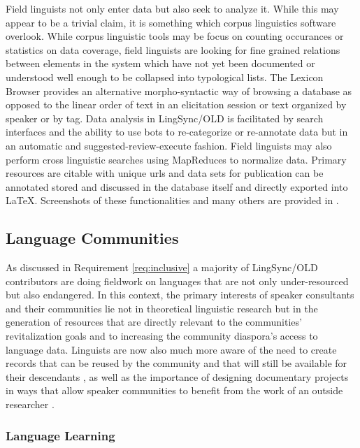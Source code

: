 \documentclass[11pt]{article}
\begin{document}
Field linguists not only enter data but also seek to analyze it. While this may appear to be a trivial claim, it is something which corpus linguistics software overlook. While corpus linguistic tools may be focus on counting occurances or statistics on data coverage, field linguists are looking for fine grained relations between elements in the system which have not yet been documented or understood well enough to be collapsed into typological lists. The Lexicon Browser provides an alternative morpho-syntactic way of browsing a database as opposed to the linear order of text in an elicitation session or text organized by speaker or by tag. Data analysis in LingSync/OLD is facilitated by search  interfaces and the ability to use bots to re-categorize or re-annotate data but in an automatic and suggested-review-execute fashion. Field linguists may also perform cross linguistic searches using MapReduces to normalize data. Primary resources are citable with unique urls and data sets for publication can be annotated stored and discussed in the database itself and directly exported into LaTeX.  Screenshots of these functionalities and many others are provided in \cite{lingsync:2012}.

%
\subsection{Language Communities}

As discussed in Requirement \autoref{req:inclusive} a majority of LingSync/OLD contributors are doing fieldwork on languages that
are not only under-resourced but also endangered. In this context, the primary
interests of speaker consultants and their communities lie not in theoretical
linguistic research but in the generation of resources that are directly
relevant to the communities' revitalization goals and to increasing the community diaspora's
access to language data. Linguists are now also much more aware of the need to
create records that can be reused by the community and that will still be
available for their descendants \cite[p.129]{Thieberger:2012}, as well as the
importance of designing documentary projects in ways that allow speaker
communities to benefit from the work of an outside researcher \cite{Good:2012}.


\subsubsection{Language Learning}
\end{document}
